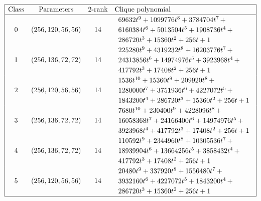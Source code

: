 \documentclass[12pt,a4paper]{article}
\begin{document}
\begin{table}[!bhpt] %
%
\small{}
\begin{align*}
\def\arraystretch{1.2}
\begin{array}{|cccl|}
\hline
\text{Class} &
\text{Parameters} &
\text{2-rank} &
\text{Clique polynomial}
\\
\hline
0 &
(256, 120, 56, 56) &
14 &
\begin{array}{l}
69632t^{9} + 1099776t^{8} + 3784704t^{7}
\,+
\\
 6160384t^{6} + 5013504t^{5} + 1908736t^{4}
\,+
\\
 286720t^{3} + 15360t^{2} + 256t + 1
\end{array}
\\
1 &
(256, 136, 72, 72) &
14 &
\begin{array}{l}
225280t^{9} + 4319232t^{8} + 16203776t^{7}
\,+
\\
 24313856t^{6} + 14974976t^{5} + 3923968t^{4}
\,+
\\
 417792t^{3} + 17408t^{2} + 256t + 1
\end{array}
\\
2 &
(256, 120, 56, 56) &
14 &
\begin{array}{l}
1536t^{10} + 15360t^{9} + 209920t^{8}
\,+
\\
 1280000t^{7} + 3751936t^{6} + 4227072t^{5}
\,+
\\
 1843200t^{4} + 286720t^{3} + 15360t^{2} + 256t + 1
\end{array}
\\
3 &
(256, 136, 72, 72) &
14 &
\begin{array}{l}
7680t^{10} + 230400t^{9} + 4228096t^{8}
\,+
\\
 16058368t^{7} + 24166400t^{6} + 14974976t^{5}
\,+
\\
 3923968t^{4} + 417792t^{3} + 17408t^{2} + 256t + 1
\end{array}
\\
4 &
(256, 136, 72, 72) &
14 &
\begin{array}{l}
110592t^{9} + 2344960t^{8} + 10305536t^{7}
\,+
\\
 18939904t^{6} + 13664256t^{5} + 3858432t^{4}
\,+
\\
 417792t^{3} + 17408t^{2} + 256t + 1
\end{array}
\\
5 &
(256, 120, 56, 56) &
14 &
\begin{array}{l}
20480t^{9} + 337920t^{8} + 1556480t^{7}
\,+
\\
 3932160t^{6} + 4227072t^{5} + 1843200t^{4}
\,+
\\
 286720t^{3} + 15360t^{2} + 256t + 1
\end{array}
\\
\hline
\end{array}
\end{align*}
\caption{$[f_{8,4]}$ extended Cayley classes.}
\label{tab-c8_4_EC_classes}
\end{table}
\end{document}
